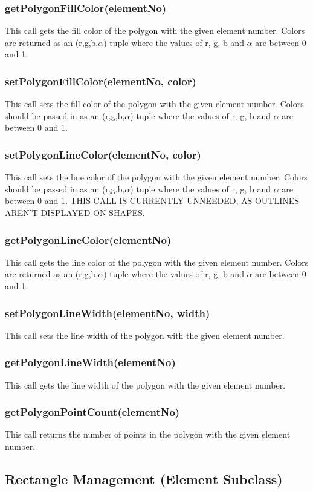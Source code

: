 \documentclass{acm_proc_article-sp}
\begin{document}
\subsubsection{getPolygonFillColor(elementNo)}
This call gets the fill color of the polygon with the given element number. Colors are returned as an (r,g,b,$\alpha$) tuple where the values of r, g, b and $\alpha$ are between 0 and 1.
\subsubsection{setPolygonFillColor(elementNo, color)}
This call sets the fill color of the polygon with the given element number. Colors should be passed in as an (r,g,b,$\alpha$) tuple where the values of r, g, b and $\alpha$ are between 0 and 1.
\subsubsection{setPolygonLineColor(elementNo, color)}
This call sets the line color of the polygon with the given element number. Colors should be passed in as an (r,g,b,$\alpha$) tuple where the values of r, g, b and $\alpha$ are between 0 and 1. THIS CALL IS CURRENTLY UNNEEDED, AS OUTLINES AREN'T DISPLAYED ON SHAPES.
\subsubsection{getPolygonLineColor(elementNo)}
This call gets the line color of the polygon with the given element number. Colors are returned as an (r,g,b,$\alpha$) tuple where the values of r, g, b and $\alpha$ are between 0 and 1.
\subsubsection{setPolygonLineWidth(elementNo, width)}
This call sets the line width of the polygon with the given element number.
\subsubsection{getPolygonLineWidth(elementNo)}
This call gets the line width of the polygon with the given element number.
\subsubsection{getPolygonPointCount(elementNo)}
This call returns the number of points in the polygon with the given element number.
\subsection{Rectangle Management (Element Subclass)}
\end{document}
